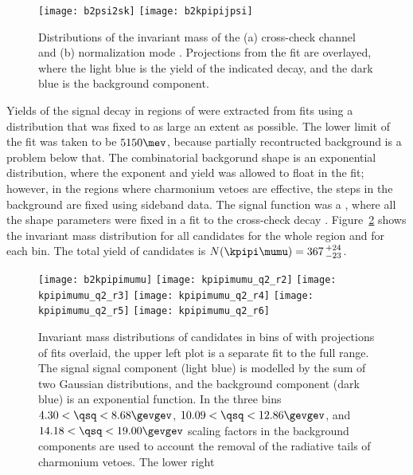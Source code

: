 \begin{figure}
  \begin{center}
    \texttt{[image: b2psi2sk]}
    \texttt{[image: b2kpipijpsi]}
    \caption{\small
      Distributions of the invariant mass of the
      (a) cross-check channel \btojpsikpipi and
      (b) normalization mode \btopsitwosk.
      Projections from the fit are overlayed, where the light blue is the yield of the indicated
      decay, and the dark blue is the background component.
    }
    \label{fig:kpipi:norm}
  \end{center}
\end{figure}



Yields of the signal decay in regions of \qsq were extracted from fits using a distribution that
was fixed to as large an extent as possible.
The lower limit of the fit was taken to be $5150\mev$, because partially recontructed background
is a problem below that.
The combinatorial backgorund shape is an exponential distribution, where the exponent and yield was
allowed to float in the fit; however, in the regions where charmonium vetoes are effective, the
steps in the background are fixed using sideband data.
The signal function was a , where all the shape
parameters were fixed in a fit to the cross-check decay \btojpsikpipi.
Figure~\ref{fig:kpipi:q2fits} shows the invariant mass distribution for all \btokpipimumu
candidates for the whole \qsq region and for each bin.
The total yield of \btokpipimumu candidates is $N(\kpipi\mumu)=367\,^{+24}_{-23}$.

\begin{figure}
  \begin{center}
    \texttt{[image: b2kpipimumu]}
    \texttt{[image: kpipimumu\_q2\_r2]}
    \texttt{[image: kpipimumu\_q2\_r3]}
    \texttt{[image: kpipimumu\_q2\_r4]}
    \texttt{[image: kpipimumu\_q2\_r5]}
    \texttt{[image: kpipimumu\_q2\_r6]}
    \caption{\small
      Invariant mass distributions of \btokpipimumu candidates in bins of \qsq with projections of
      fits overlaid, the upper left plot is a separate fit to the full \qsq range.
      The signal signal component (light blue) is modelled by the sum of two Gaussian
      distributions, and the background component (dark blue) is an exponential function.
      In the three \qsq bins $4.30<\qsq<8.68\gevgev$, $10.09<\qsq<12.86\gevgev$, and
      $14.18<\qsq<19.00\gevgev$ scaling factors in the background components are used to account
      the removal of the radiative tails of charmonium vetoes.
      The lower right
    }
    \label{fig:kpipi:q2fits}
  \end{center}
\end{figure}

